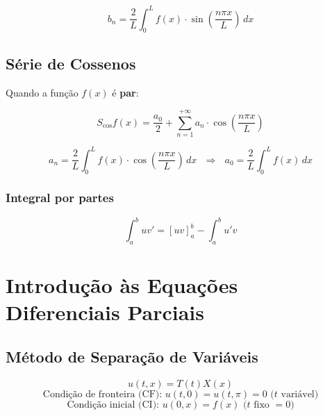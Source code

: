 \documentclass[11pt, a4paper]{article}
\begin{document}
\begin{equation*}
    b_n =
    \frac{2}{L} \int_{0}^{L} f(x) \cdot \sin\left(\frac{n\pi x}{L}\right) \, dx
\end{equation*}

\subsection{Série de Cossenos}

Quando a função $f(x)$ é \textbf{par}:

\begin{equation*}
    S_{\cos} f(x) = \frac{a_0}{2} + \sum_{n=1}^{+\infty}
    a_n \cdot \cos\left(\frac{n\pi x}{L}\right)
\end{equation*}

\begin{equation*}
    a_n =
    \frac{2}{L} \int_{0}^{L} f(x) \cdot \cos\left(\frac{n\pi x}{L}\right) \, dx
    \ \ \ \Rightarrow \ \ \
    a_0 =
    \frac{2}{L} \int_{0}^{L} f(x) \, dx
\end{equation*}

\subsubsection*{Integral por partes}

\begin{equation*}
    \int_a^b uv' = [uv] _a^b - \int_a^b u'v
\end{equation*}

\newpage

\section{Introdução às Equações Diferenciais Parciais}

\subsection{Método de Separação de Variáveis}

\begin{equation*}
    u(t, x) = T(t)X(x)
\end{equation*}
\begin{equation*}
    \text{Condição de fronteira (CF):\ \ } u(t, 0) = u(t, \pi) = 0 \text{\ \ ($t$ variável)}
\end{equation*}
\begin{equation*}
    \text{Condição inicial (CI):\ \ } u(0, x) = f(x) \text{\ \ ($t$ fixo $= 0$)}
\end{equation*}
\end{document}

